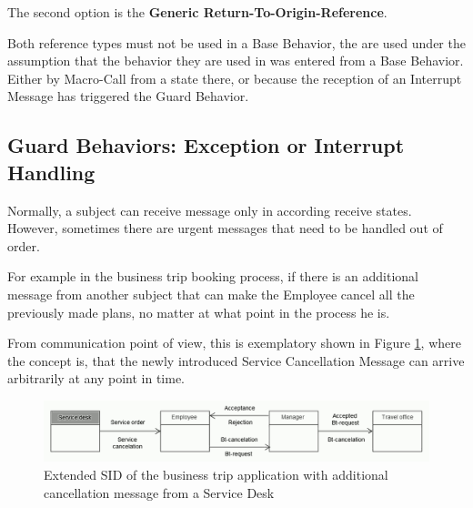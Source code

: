 The second option is the \textbf{Generic Return-To-Origin-Reference}.

Both reference types must not be used in a Base Behavior, the are used under the assumption that the behavior they are used in was entered from a Base Behavior. Either by Macro-Call from a state there, or because the reception of an Interrupt Message has triggered the Guard Behavior. 




\subsection{Guard Behaviors: Exception or Interrupt Handling} 

Normally, a subject can receive message only in according receive states. However, sometimes there are urgent messages that need to be handled out of order.

For example in the business trip booking process, if there is an additional message from another subject that can make the Employee cancel all the previously made plans, no matter at what point in the process he is.

From communication point of view, this is exemplatory shown in Figure \ref{fig:sid-exception}, where the concept is, that the newly introduced Service Cancellation Message can arrive arbitrarily at any point in time.

\begin{figure}[ph!]
	\centering
	\includegraphics[width=0.9\linewidth]{Figures/Ontology/SubjectBehavior/SID-Exception}
	\caption[Extended SID of the business trip application with additional cancellation message from a Service Desk]{Extended SID of the business trip application with additional cancellation message from a Service Desk}
	\label{fig:sid-exception}
\end{figure}

